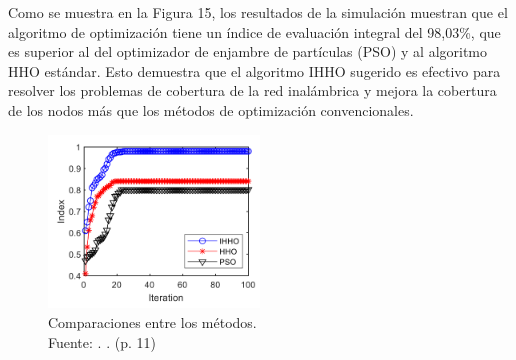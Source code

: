 Como se muestra en la Figura 15, los resultados de la simulación muestran que el algoritmo de optimización tiene un índice de evaluación integral del 98,03\%, que es superior al del optimizador de enjambre de partículas (PSO) y al algoritmo HHO estándar. Esto demuestra que el algoritmo IHHO sugerido es efectivo para resolver los problemas de cobertura de la red inalámbrica y mejora la cobertura de los nodos más que los métodos de optimización convencionales.

\begin{figure}[!ht]
	\begin{center}
		\includegraphics[width=0.5\textwidth]{2/figures/dou2023_2.png}
		\caption[Comparaciones entre los métodos]{Comparaciones entre los métodos.\\
			Fuente: \cite{pr_dou2023researchwir}. . (p. 11)}
		\label{2:fig124}
	\end{center}
\end{figure}
\clearpage